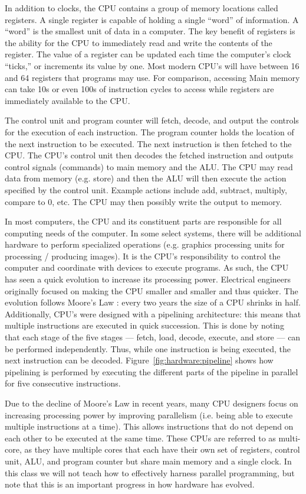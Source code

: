 In addition to clocks, the CPU contains a group of memory locations called registers.
A single register is capable of holding a single ``word'' of information. A ``word'' is the smallest
unit of data in a computer. The key benefit of registers is the ability for the
CPU to immediately read and write the contents of the register. The value of a register
can be updated each time the computer's clock ``ticks,'' or increments its value by one. 
Most modern CPU's will have between 16 and 64 registers that programs may use.
For comparison, accessing Main memory can take 10s or even 100s of instruction
cycles to access while registers are immediately available to the CPU.

The control unit and program counter will fetch, decode, and output the
controls for the execution of each instruction. The program counter holds the
location of the next instruction to be executed. The next instruction is then
fetched to the CPU. The CPU's control unit then decodes the fetched instruction
and outputs control signals (commands) to main memory and the ALU. The CPU may
read data from memory (e.g. store) and then the ALU will then execute the action
specified by the control unit. Example actions include add, subtract, multiply, compare to 0, etc.
The CPU may then possibly write the output to memory.

In most computers, the CPU and its constituent parts are responsible for all
computing needs of the computer. In some select systems, there will be additional
hardware to perform specialized operations (e.g. graphics processing units for
processing / producing images). It is the CPU's responsibility to control the
computer and coordinate with devices to execute programs. As such, the CPU
has seen a quick evolution to increase its processing power. Electrical
engineers originally focused on making the CPU smaller and smaller and thus
quicker. The evolution follows Moore's Law : every two years the size of a CPU shrinks
in half. Additionally, CPU's were designed with a pipelining architecture: this means
that multiple instructions are executed in quick succession. This is done
by noting that each stage of the five stages --- fetch, load,  decode, execute,
and store --- can be performed independently. Thus, while one instruction is
being executed, the next instruction can be decoded. Figure~\ref{fig:hardware:pipeline}
shows how pipelining is performed by executing the different parts of the pipeline
in parallel for five consecutive instructions.

Due to the decline of Moore's Law in recent years, many CPU designers focus on
increasing processing power by improving parallelism (i.e. being able to execute
multiple instructions at a time). This allows instructions that do not depend
on each other to be executed at the same time. These CPUs are referred to as multi-core,
as they have multiple cores that each have their own set of registers, control unit,
ALU, and program counter but share main memory and a single clock. In this class we will not
teach how to effectively harness parallel programming, but note that this is
an important progress in how hardware has evolved.

